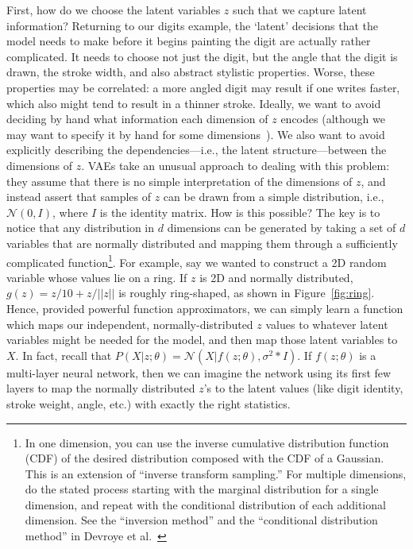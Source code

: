 \documentclass[a4paper, 11pt]{article} %
\begin{document}
First, how do we choose the latent variables $z$ such that we capture latent information?  
Returning to our digits example, the `latent' decisions that the model needs to make before it begins painting the digit are actually rather complicated.  
It needs to choose not just the digit, but the angle that the digit is drawn, the stroke width, and also abstract stylistic properties.  
Worse, these properties may be correlated: a more angled digit may result if one writes faster, which also might tend to result in a thinner stroke.
Ideally, we want to avoid deciding by hand what information each dimension of $z$ encodes (although we may want to specify it by hand for some dimensions~\cite{kulkarni2015deep}).  
We also want to avoid explicitly describing the dependencies---i.e., the latent structure---between the dimensions of $z$.
VAEs take an unusual approach to dealing with this problem: they assume that there is no simple interpretation of the dimensions of $z$, and instead assert that samples of $z$ can be drawn from a simple distribution, i.e., $\mathcal{N}(0,I)$, where $I$ is the identity matrix.    
How is this possible?
The key is to notice that any distribution in $d$ dimensions can be generated by taking a set of $d$ variables that are normally distributed and mapping them through a sufficiently complicated function\footnote{In one dimension, you can use the inverse cumulative distribution function (CDF) of the desired distribution composed with the CDF of a Gaussian.  This is an extension of ``inverse transform sampling.''  For multiple dimensions, do the stated process starting with the marginal distribution for a single dimension, and repeat with the conditional distribution of each additional dimension.  See the ``inversion method'' and the ``conditional distribution method'' in Devroye et al.~\cite{devroye1986sample}}.  
For example, say we wanted to construct a 2D random variable whose values lie on a ring.  
If $z$ is 2D and normally distributed, $g(z)=z/10+z/||z||$ is roughly ring-shaped, as shown in Figure~\ref{fig:ring}.  
Hence, provided powerful function approximators, we can simply learn a function which maps our independent, normally-distributed $z$ values to whatever latent variables might be needed for the model, and then map those latent variables to $X$. 
In fact, recall that $P(X|z;\theta) = \mathcal{N}(X|f(z;\theta),\sigma^2*I)$.
If $f(z;\theta)$ is a multi-layer neural network, then we can imagine the network using its first few layers to map the normally distributed $z$'s to the latent values (like digit identity, stroke weight, angle, etc.) with exactly the right statistics.
\end{document}
